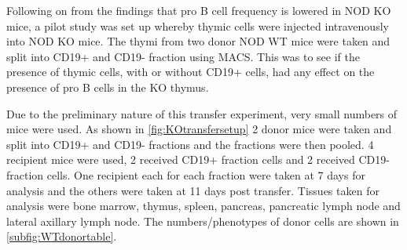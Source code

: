 Following on from the findings that pro B cell frequency is lowered in NOD KO mice, a pilot study was set up whereby thymic cells were injected intravenously into NOD KO mice.
The thymi from two donor NOD WT mice were taken and split into CD19+ and CD19- fraction using MACS.
This was to see if the presence of thymic cells, with or without CD19+ cells, had any effect on the presence of pro B cells in the KO thymus.

Due to the preliminary nature of this transfer experiment, very small numbers of mice were used.
As shown in \cref{fig:KOtransfersetup} 2 donor mice were taken and split into CD19+ and CD19- fractions and the fractions were then pooled.
4 recipient mice were used, 2 received CD19+ fraction cells and 2 received CD19- fraction cells.
One recipient each for each fraction were taken at 7 days for analysis and the others were taken at 11 days post transfer.
Tissues taken for analysis were bone marrow, thymus, spleen, pancreas, pancreatic lymph node and lateral axillary lymph node.
The numbers/phenotypes of donor cells are shown in \cref{subfig:WTdonortable}.



